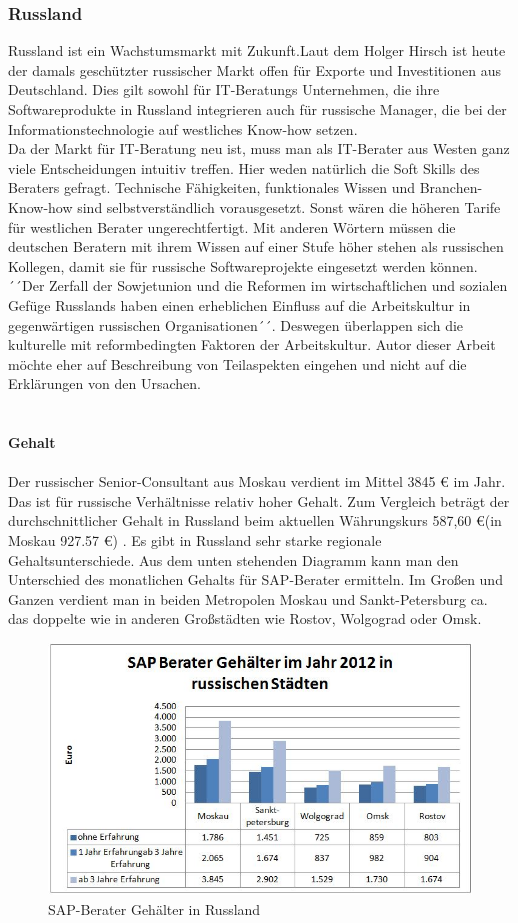 	\subsubsection{Russland}
	Russland ist ein Wachstumsmarkt mit Zukunft.Laut dem Holger Hirsch ist heute der damals geschützter russischer Markt offen für Exporte und Investitionen aus Deutschland. Dies gilt sowohl für IT-Beratungs Unternehmen, die ihre Softwareprodukte in Russland integrieren auch für russische Manager, die bei der Informationstechnologie auf westliches Know-how setzen.\cite{ITConsRu}\\
	Da der Markt für IT-Beratung neu ist, muss man als IT-Berater aus Westen ganz viele Entscheidungen intuitiv treffen. Hier weden natürlich die Soft Skills des Beraters gefragt. Technische Fähigkeiten, funktionales Wissen und Branchen-Know-how sind selbstverständlich vorausgesetzt. Sonst wären die höheren Tarife für westlichen Berater ungerechtfertigt. Mit anderen Wörtern müssen die deutschen Beratern mit ihrem Wissen auf einer Stufe höher stehen als russischen Kollegen, damit sie für russische Softwareprojekte eingesetzt werden können. ´´Der Zerfall der Sowjetunion und die Reformen im wirtschaftlichen und sozialen Gefüge Russlands haben einen erheblichen Einfluss auf die Arbeitskultur in gegenwärtigen russischen Organisationen´´\cite{ProzessbeglBerRU}.
	Deswegen überlappen sich die kulturelle mit reformbedingten Faktoren der Arbeitskultur. Autor dieser Arbeit möchte eher auf Beschreibung von Teilaspekten  eingehen und nicht auf die Erklärungen von den Ursachen.\\\\ \\
	\textbf{Gehalt}\\ 
	\\
	Der russischer Senior-Consultant aus Moskau verdient im Mittel 3845 € im Jahr. Das ist für russische Verhältnisse relativ hoher Gehalt. Zum Vergleich beträgt der durchschnittlicher Gehalt in Russland beim aktuellen Währungskurs 587,60 €(in Moskau 927.57 €) \cite{RusGehAllgm}. Es gibt  in Russland sehr starke regionale Gehaltsunterschiede. Aus dem unten stehenden Diagramm kann man den Unterschied des monatlichen Gehalts für SAP-Berater ermitteln. Im Großen und Ganzen verdient man in beiden Metropolen Moskau und Sankt-Petersburg ca. das doppelte wie in anderen Großstädten wie Rostov, Wolgograd oder Omsk.
	\\
\begin{figure}[htp]
\centering
\includegraphics[width=0.7\linewidth]{./images/SAP-Berater_Gehalt_RU}
\caption{SAP-Berater Gehälter in Russland}
\label{fig:SAP-Berater_Gehalt_RU}
\end{figure}
